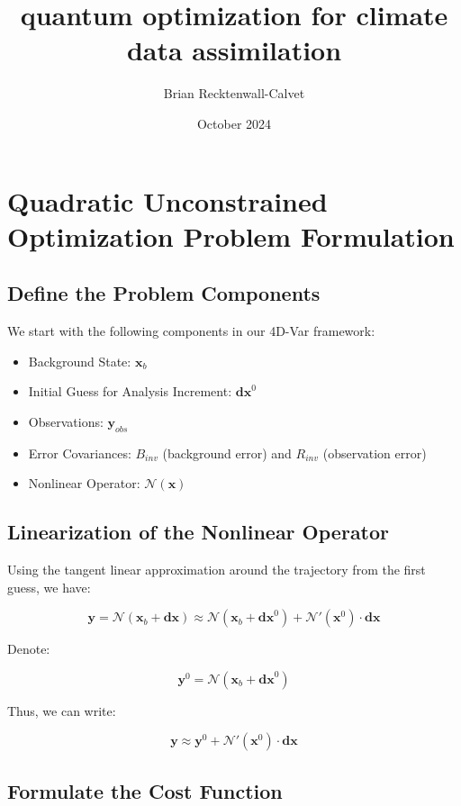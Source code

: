 \documentclass{article}
\title{quantum optimization for climate data assimilation}
\author{Brian Recktenwall-Calvet}
\date{October 2024}
\begin{document}
\maketitle
\section{Quadratic Unconstrained Optimization Problem Formulation}

\subsection{Define the Problem Components}

We start with the following components in our 4D-Var framework:

\begin{itemize}
    \item Background State: \( \mathbf{x}_b \)
    \item Initial Guess for Analysis Increment: \( \mathbf{dx}^0 \)
    \item Observations: \( \mathbf{y}_{obs} \)
    \item Error Covariances: \( B_{inv} \) (background error) and \( R_{inv} \) (observation error)
    \item Nonlinear Operator: \( \mathcal{N}(\mathbf{x}) \)
\end{itemize}

\subsection{Linearization of the Nonlinear Operator}

Using the tangent linear approximation around the trajectory from the first guess, we have:

\[
\mathbf{y} = \mathcal{N}(\mathbf{x}_b + \mathbf{dx}) \approx \mathcal{N}(\mathbf{x}_b + \mathbf{dx}^0) + \mathcal{N}'(\mathbf{x}^0) \cdot \mathbf{dx}
\]

Denote:

\[
\mathbf{y}^0 = \mathcal{N}(\mathbf{x}_b + \mathbf{dx}^0)
\]

Thus, we can write:

\[
\mathbf{y} \approx \mathbf{y}^0 + \mathcal{N}'(\mathbf{x}^0) \cdot \mathbf{dx}
\]

\subsection{Formulate the Cost Function}
\end{document}
